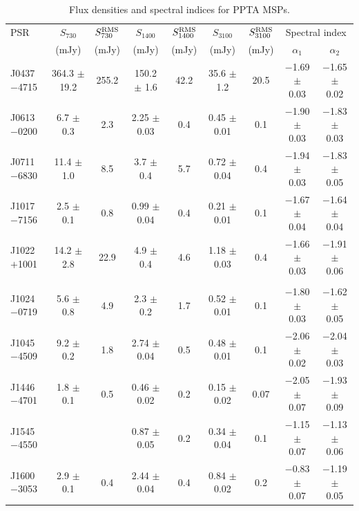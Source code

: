 \documentclass[useAMS,usenatbib]{mn2e}
\begin{document}
\begin{table}
\centering
\caption{Flux densities and spectral indices for PPTA MSPs.}
\label{tableFlux}
\begin{tabular}{lcccccccc}
\hline
PSR              & $S_{730}$&$S^{\rm{RMS}}_{730}$&$S_{1400}$&$S^{\rm{RMS}}_{1400}$&$S_{3100}$&$S^{\rm{RMS}}_{3100}$& \multicolumn{2}{c}{Spectral index} \\
								 &  (mJy)   &    (mJy)           & (mJy)    &    (mJy)            &  (mJy)   &    (mJy)            &   $\alpha_{1}$ & $\alpha_{2}$ \\
\hline
 J0437$-$4715  &  364.3 $\pm$ 19.2 &  255.2 &  150.2 $\pm$ 1.6  &  42.2 &  35.6 $\pm$ 1.2  &  20.5  &  $-$1.69 $\pm$ 0.03 &  $-$1.65 $\pm$ 0.02 \\ 
 J0613$-$0200  &  6.7   $\pm$ 0.3  &  2.3   &  2.25  $\pm$ 0.03 &  0.4  &  0.45 $\pm$ 0.01 &  0.1   &  $-$1.90 $\pm$ 0.03 &  $-$1.83 $\pm$ 0.03 \\ 
 J0711$-$6830  &  11.4  $\pm$ 1.0  &  8.5   &  3.7   $\pm$ 0.4  &  5.7  &  0.72 $\pm$ 0.04 &  0.4   &  $-$1.94 $\pm$ 0.03 &  $-$1.83 $\pm$ 0.05 \\ 
 J1017$-$7156  &  2.5   $\pm$ 0.1  &  0.8   &  0.99  $\pm$ 0.04 &  0.4  &  0.21 $\pm$ 0.01 &  0.1   &  $-$1.67 $\pm$ 0.04 &  $-$1.64 $\pm$ 0.04 \\ 
 J1022$+$1001  &  14.2  $\pm$ 2.8  &  22.9  &  4.9   $\pm$ 0.4  &  4.6  &  1.18 $\pm$ 0.03 &  0.4   &  $-$1.66 $\pm$ 0.03 &  $-$1.91 $\pm$ 0.06 \\ 
               &	                 &        &                   &       &                  &        &                     &                     \\ 
 J1024$-$0719  &  5.6   $\pm$ 0.8  &  4.9   &  2.3   $\pm$ 0.2  &  1.7  &  0.52 $\pm$ 0.01 &  0.1   &  $-$1.80 $\pm$ 0.03 &  $-$1.62 $\pm$ 0.05 \\ 
 J1045$-$4509  &  9.2   $\pm$ 0.2  &  1.8   &  2.74  $\pm$ 0.04 &  0.5  &  0.48 $\pm$ 0.01 &  0.1   &  $-$2.06 $\pm$ 0.02 &  $-$2.04 $\pm$ 0.03 \\ 
 J1446$-$4701  &  1.8   $\pm$ 0.1  &  0.5   &  0.46  $\pm$ 0.02 &  0.2  &  0.15 $\pm$ 0.02 &  0.07  &  $-$2.05 $\pm$ 0.07 &  $-$1.93 $\pm$ 0.09 \\ 
 J1545$-$4550  &                   &        &  0.87  $\pm$ 0.05 &  0.2  &  0.34 $\pm$ 0.04 &  0.1   &  $-$1.15 $\pm$ 0.07 &  $-$1.13 $\pm$ 0.06 \\ 
 J1600$-$3053  &  2.9   $\pm$ 0.1  &  0.4   &  2.44  $\pm$ 0.04 &  0.4  &  0.84 $\pm$ 0.02 &  0.2   &  $-$0.83 $\pm$ 0.07 &  $-$1.19 $\pm$ 0.05 \\ 

\end{tabular}
\end{table}
\end{document}
